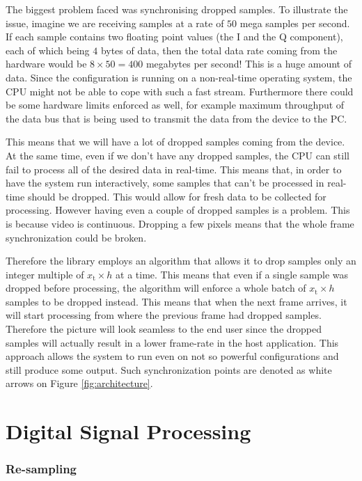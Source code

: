 \documentclass[a4paper,12pt,twoside,openright]{report}
\begin{document}
The biggest problem faced was synchronising dropped samples. To illustrate the issue, imagine we are receiving samples at a rate of $50$ mega samples per second. If each sample contains two floating point values (the I and the Q component), each of which being $4$ bytes of data, then the total data rate coming from the hardware would be $8 \times 50 = 400$ megabytes per second! This is a huge amount of data. Since the configuration is running on a non-real-time operating system, the CPU might not be able to cope with such a fast stream. Furthermore there could be some hardware limits enforced as well, for example maximum throughput of the data bus that is being used to transmit the data from the device to the PC.

This means that we will have a lot of dropped samples coming from the device. At the same time, even if we don't have any dropped samples, the CPU can still fail to process all of the desired data in real-time. This means that, in order to have the system run interactively, some samples that can't be processed in real-time should be dropped. This would allow for fresh data to be collected for processing. However having even a couple of dropped samples is a problem. This is because video is continuous. Dropping a few pixels means that the whole frame synchronization could be broken.

Therefore the library employs an algorithm that allows it to drop samples only an integer multiple of $x_\text{t} \times h$ at a time. This means that even if a single sample was dropped before processing, the algorithm will enforce a whole batch of $x_\text{t} \times h$ samples to be dropped instead. This means that when the next frame arrives, it will start processing from where the previous frame had dropped samples. Therefore the picture will look seamless to the end user since the dropped samples will actually result in a lower frame-rate in the host application. This approach allows the system to run even on not so powerful configurations and still produce some output. Such synchronization points are denoted as white arrows on Figure \ref{fig:architecture}.

\section{Digital Signal Processing}

\subsubsection{Re-sampling}
\end{document}

